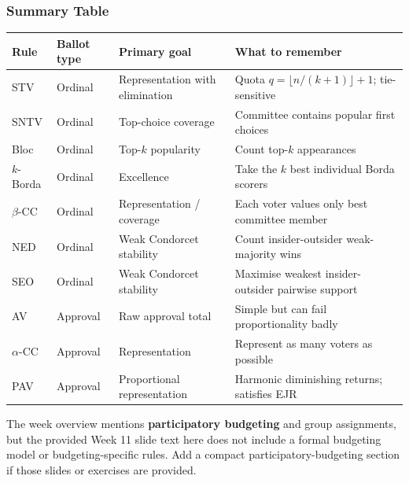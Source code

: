 \separator

\subsubsection{Summary Table}

\begin{center}
\renewcommand{\arraystretch}{1.25}
\begin{tabular}{@{}p{2.2cm}p{2.2cm}p{2.3cm}p{4.1cm}@{}}
\toprule
\textbf{Rule} & \textbf{Ballot type} & \textbf{Primary goal} & \textbf{What to remember} \\
\midrule
STV & Ordinal & Representation with elimination & Quota $q=\lfloor n/(k+1)\rfloor+1$; tie-sensitive \\
SNTV & Ordinal & Top-choice coverage & Committee contains popular first choices \\
Bloc & Ordinal & Top-$k$ popularity & Count top-$k$ appearances \\
$k$-Borda & Ordinal & Excellence & Take the $k$ best individual Borda scorers \\
$\beta$-CC & Ordinal & Representation / coverage & Each voter values only best committee member \\
NED & Ordinal & Weak Condorcet stability & Count insider-outsider weak-majority wins \\
SEO & Ordinal & Weak Condorcet stability & Maximise weakest insider-outsider pairwise support \\
AV & Approval & Raw approval total & Simple but can fail proportionality badly \\
$\alpha$-CC & Approval & Representation & Represent as many voters as possible \\
PAV & Approval & Proportional representation & Harmonic diminishing returns; satisfies EJR \\
\bottomrule
\end{tabular}
\end{center}

\begin{tipbox}
The week overview mentions \textbf{participatory budgeting} and group assignments, but the provided Week 11 slide text here does not include a formal budgeting model or budgeting-specific rules. \TODO{} Add a compact participatory-budgeting section if those slides or exercises are provided.
\end{tipbox}
